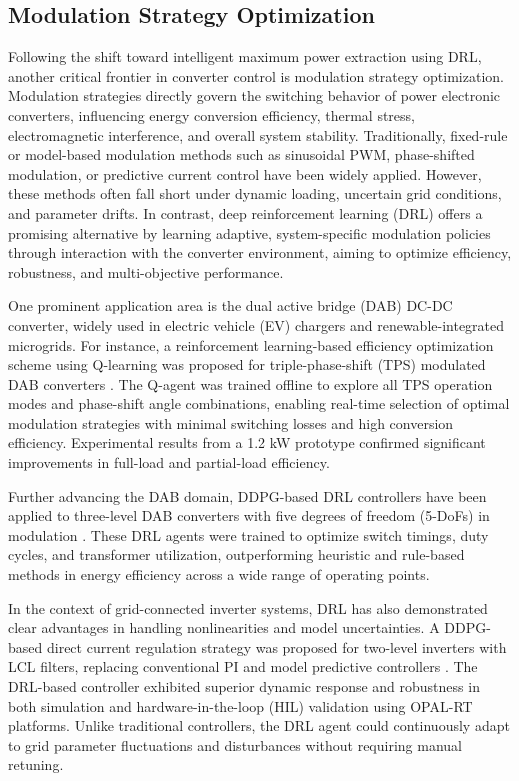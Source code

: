 \subsection{Modulation Strategy Optimization}
\label{sec:ctrl_modulation}

Following the shift toward intelligent maximum power extraction using DRL, another critical frontier in converter control is modulation strategy optimization. Modulation strategies directly govern the switching behavior of power electronic converters, influencing energy conversion efficiency, thermal stress, electromagnetic interference, and overall system stability. Traditionally, fixed-rule or model-based modulation methods such as sinusoidal PWM, phase-shifted modulation, or predictive current control have been widely applied. However, these methods often fall short under dynamic loading, uncertain grid conditions, and parameter drifts. In contrast, deep reinforcement learning (DRL) offers a promising alternative by learning adaptive, system-specific modulation policies through interaction with the converter environment, aiming to optimize efficiency, robustness, and multi-objective performance.

One prominent application area is the dual active bridge (DAB) DC-DC converter, widely used in electric vehicle (EV) chargers and renewable-integrated microgrids. For instance, a reinforcement learning-based efficiency optimization scheme using Q-learning was proposed for triple-phase-shift (TPS) modulated DAB converters \cite{tang2020reinforcement}. The Q-agent was trained offline to explore all TPS operation modes and phase-shift angle combinations, enabling real-time selection of optimal modulation strategies with minimal switching losses and high conversion efficiency. Experimental results from a 1.2 kW prototype confirmed significant improvements in full-load and partial-load efficiency.

Further advancing the DAB domain, DDPG-based DRL controllers have been applied to three-level DAB converters with five degrees of freedom (5-DoFs) in modulation \cite{feng2024artificial}. These DRL agents were trained to optimize switch timings, duty cycles, and transformer utilization, outperforming heuristic and rule-based methods in energy efficiency across a wide range of operating points.

In the context of grid-connected inverter systems, DRL has also demonstrated clear advantages in handling nonlinearities and model uncertainties. A DDPG-based direct current regulation strategy was proposed for two-level inverters with LCL filters, replacing conventional PI and model predictive controllers \cite{rajamallaiah2024direct}. The DRL-based controller exhibited superior dynamic response and robustness in both simulation and hardware-in-the-loop (HIL) validation using OPAL-RT platforms. Unlike traditional controllers, the DRL agent could continuously adapt to grid parameter fluctuations and disturbances without requiring manual retuning.

